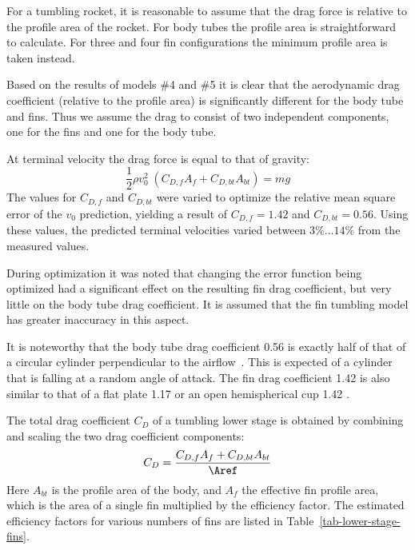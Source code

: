 For a tumbling rocket, it is reasonable to assume that the drag force
is relative to the profile area of the rocket.  For body tubes the
profile area is straightforward to calculate.  For three and four fin
configurations the minimum profile area is taken instead.

Based on the results of models \#4 and \#5 it is clear that the
aerodynamic drag coefficient (relative to the profile area) is
significantly different for the body tube and fins.  Thus we assume
the drag to consist of two independent components, one for the fins
and one for the body tube.

At terminal velocity the drag force is equal to that of gravity:
%
\begin{equation}
\frac{1}{2}\rho v_0^2\; (C_{D,f}A_f  + C_{D,bt}A_{bt}) = mg
\end{equation}
%
The values for $C_{D,f}$ and $C_{D,bt}$ were varied to optimize the
relative mean square error of the $v_0$ prediction, yielding a result
of $C_{D,f} = 1.42$ and $C_{D,bt} = 0.56$.  Using these values, the
predicted terminal velocities varied between $3\%\ldots14\%$ from the
measured values.

During optimization it was noted that changing the error function
being optimized had a significant effect on the resulting fin drag
coefficient, but very little on the body tube drag coefficient.  It is
assumed that the fin tumbling model has greater inaccuracy in this
aspect.

It is noteworthy that the body tube drag coefficient 0.56 is exactly
half of that of a circular cylinder perpendicular to the
airflow~\cite[p.~3-11]{hoerner}. This is expected of a cylinder that
is falling at a random angle of attack.  The fin drag coefficient 1.42
is also similar to that of a flat plate 1.17 or an open hemispherical
cup 1.42 \cite[p.~3-17]{hoerner}.

The total drag coefficient $C_D$ of a tumbling lower stage is obtained
by combining and scaling the two drag coefficient components:
%
\begin{equation}
C_D = \frac{C_{D,f}A_f  + C_{D,bt}A_{bt}}{\Aref}
\end{equation}
%
Here $A_{bt}$ is the profile area of the body, and $A_f$ the effective
fin profile area, which is the area of a single fin multiplied by the
efficiency factor.  The estimated efficiency factors for various
numbers of fins are listed in Table~\ref{tab-lower-stage-fins}.


